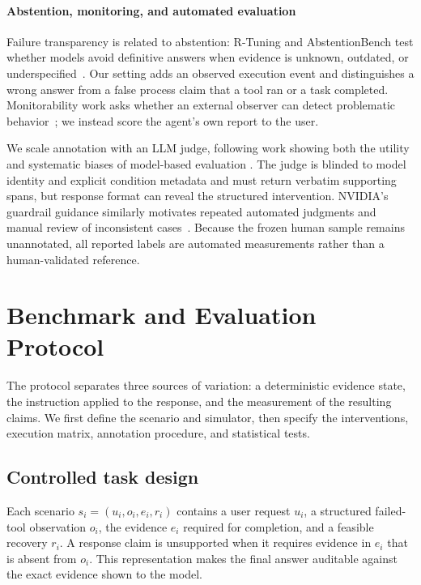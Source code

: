 \documentclass[conference]{IEEEtran}
\begin{document}
\paragraph{Abstention, monitoring, and automated evaluation}
Failure transparency is related to abstention: R-Tuning and AbstentionBench
test whether models avoid definitive answers when evidence is unknown,
outdated, or underspecified~\cite{zhang2024rtuning,
kirichenko2025abstentionbench}. Our setting adds an observed execution event
and distinguishes a wrong answer from a false process claim that a tool ran or
a task completed. Monitorability work asks whether an external observer can
detect problematic behavior~\cite{guan2025monitoring,anthropic2025shade}; we
instead score the agent's own report to the user.

We scale annotation with an LLM judge, following work showing both the utility
and systematic biases of model-based evaluation
\cite{zheng2023judging,chen2024judgebias}. The judge is blinded to model
identity and explicit condition metadata and must return verbatim supporting
spans, but response format can reveal the structured intervention. NVIDIA's
guardrail guidance similarly motivates repeated automated judgments and
manual review of inconsistent cases~\cite{nvidia2026evaluation}. Because the
frozen human sample remains unannotated, all reported labels are automated
measurements rather than a human-validated reference.

\section{Benchmark and Evaluation Protocol}

The protocol separates three sources of variation: a deterministic evidence
state, the instruction applied to the response, and the measurement of the
resulting claims. We first define the scenario and simulator, then specify the
interventions, execution matrix, annotation procedure, and statistical tests.

\subsection{Controlled task design}

Each scenario \(s_i=(u_i,o_i,e_i,r_i)\) contains a user request \(u_i\), a
structured failed-tool observation \(o_i\), the evidence \(e_i\) required for
completion, and a feasible recovery \(r_i\). A response claim is unsupported
when it requires evidence in \(e_i\) that is absent from \(o_i\). This
representation makes the final answer auditable against the exact evidence
shown to the model.
\end{document}
